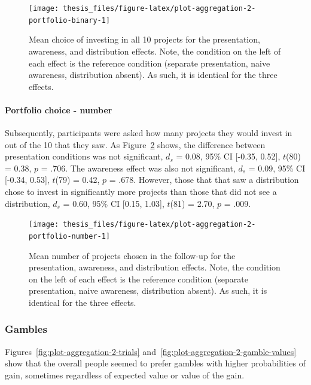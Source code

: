\documentclass[a4paper, nobind, dvipsnames]{templates/ociamthesis}
\theoremstyle{definition}
\theoremstyle{definition}
\theoremstyle{definition}
\theoremstyle{definition}
\theoremstyle{remark}
\begin{document}
\begin{figure}
\texttt{[image: thesis\_files/figure-latex/plot-aggregation-2-portfolio-binary-1]} \caption{Mean choice of investing in all 10 projects for the presentation, awareness, and distribution effects. Note, the condition on the left of each effect is the reference condition (separate presentation, naive awareness, distribution absent). As such, it is identical for the three effects.}\label{fig:plot-aggregation-2-portfolio-binary}
\end{figure}

\paragraph{Portfolio choice - number}

Subsequently, participants were asked how many projects they would invest in out
of the 10 that they saw. As
Figure~\ref{fig:plot-aggregation-2-portfolio-number} shows, the difference
between presentation conditions was not significant,
\(d_s\) = 0.08, 95\% CI {[}-0.35, 0.52{]}, \(t\)(80) = 0.38, \(p\) = .706. The awareness effect
was also not significant, \(d_s\) = 0.09, 95\% CI {[}-0.34, 0.53{]}, \(t\)(79) = 0.42, \(p\) = .678.
However, those that that saw a distribution chose to invest in significantly
more projects than those that did not see a distribution,
\(d_s\) = 0.60, 95\% CI {[}0.15, 1.03{]}, \(t\)(81) = 2.70, \(p\) = .009.



\begin{figure}
\texttt{[image: thesis\_files/figure-latex/plot-aggregation-2-portfolio-number-1]} \caption{Mean number of projects chosen in the follow-up for the presentation, awareness, and distribution effects. Note, the condition on the left of each effect is the reference condition (separate presentation, naive awareness, distribution absent). As such, it is identical for the three effects.}\label{fig:plot-aggregation-2-portfolio-number}
\end{figure}

\subsubsection{Gambles}

Figures~\ref{fig:plot-aggregation-2-trials}
and~\ref{fig:plot-aggregation-2-gamble-values} show that the overall people
seemed to prefer gambles with higher probabilities of gain, sometimes regardless
of expected value or value of the gain.
\end{document}
